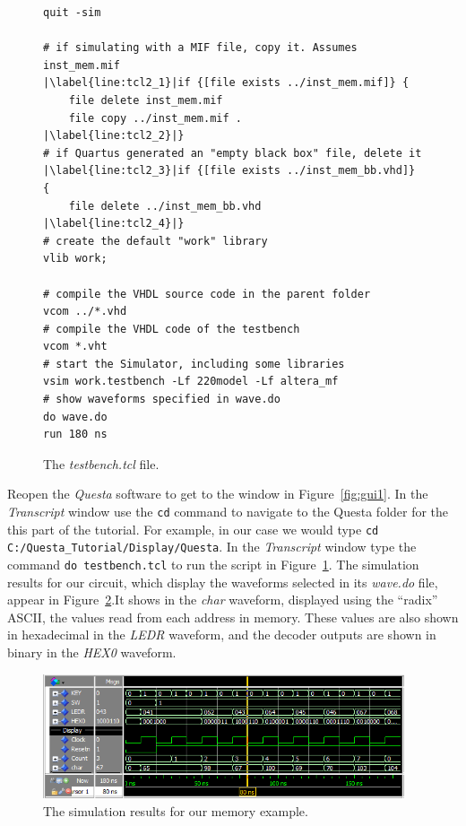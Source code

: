 \documentclass[11pt, twoside, pdftex]{article}
\begin{document}
\lstset{language=Tcl,numbers=left,escapechar=|}
\begin{figure}[h!]
\begin{center}
\begin{minipage}[h]{15 cm}
\begin{lstlisting}[name=tcl2]
quit -sim

# if simulating with a MIF file, copy it. Assumes inst_mem.mif
|\label{line:tcl2_1}|if {[file exists ../inst_mem.mif]} {
	file delete inst_mem.mif
	file copy ../inst_mem.mif .
|\label{line:tcl2_2}|}
# if Quartus generated an "empty black box" file, delete it
|\label{line:tcl2_3}|if {[file exists ../inst_mem_bb.vhd]} {
	file delete ../inst_mem_bb.vhd
|\label{line:tcl2_4}|}
# create the default "work" library
vlib work;

# compile the VHDL source code in the parent folder
vcom ../*.vhd
# compile the VHDL code of the testbench
vcom *.vht
# start the Simulator, including some libraries
vsim work.testbench -Lf 220model -Lf altera_mf
# show waveforms specified in wave.do
do wave.do
run 180 ns
\end{lstlisting}
\end{minipage}
\caption{The {\it testbench.tcl} file.}
\label{fig:tcl2}
\end{center}
\end{figure}

\noindent
Reopen the {\it Questa} software to get to the window in Figure~\ref{fig:gui1}.
In the {\it Transcript} window use the \texttt{cd} command to navigate to the 
Questa folder for the this part of the tutorial. For example, in our 
case we would type \texttt{cd C:/Questa\_Tutorial/Display/Questa}. 
In the {\it Transcript} window type the command \texttt{do~testbench.tcl} to run
the script in Figure~\ref{fig:tcl2}.
The simulation results for our circuit, which display the waveforms selected in its
{\it wave.do} file, appear in Figure~\ref{fig:gui4}.It shows in the {\it char} 
waveform, displayed using the ``radix'' ASCII, the values read from each address in memory.
These values are also shown in hexadecimal in the {\it LEDR} waveform, and the 
decoder outputs are shown in binary in the {\it HEX0} waveform.

\begin{figure}[h!]
	\begin{center}
		\includegraphics[width = 0.95\textwidth]{figures/display.png}
	\end{center}
		  \caption{The simulation results for our memory example.}
	\label{fig:gui4}
\end{figure}
\end{document}
